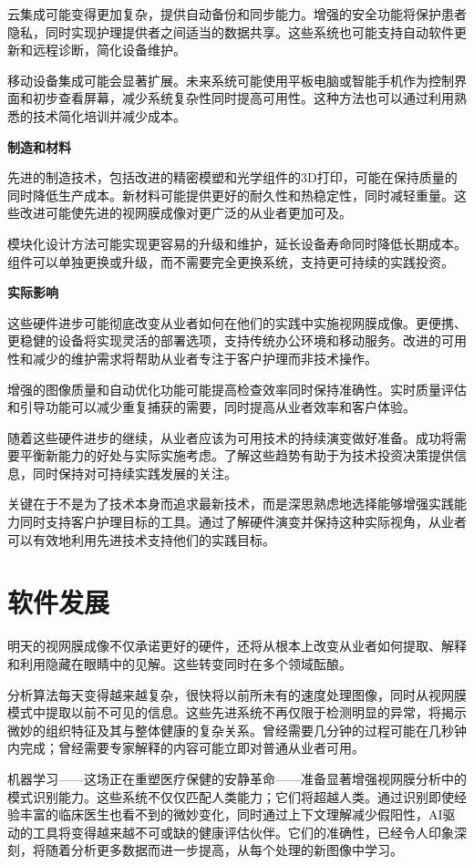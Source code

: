 \documentclass[
  Letterpaper,
]{scrbook}
\begin{document}
云集成可能变得更加复杂，提供自动备份和同步能力。增强的安全功能将保护患者隐私，同时实现护理提供者之间适当的数据共享。这些系统也可能支持自动软件更新和远程诊断，简化设备维护。

移动设备集成可能会显著扩展。未来系统可能使用平板电脑或智能手机作为控制界面和初步查看屏幕，减少系统复杂性同时提高可用性。这种方法也可以通过利用熟悉的技术简化培训并减少成本。

\textbf{制造和材料}

先进的制造技术，包括改进的精密模塑和光学组件的3D打印，可能在保持质量的同时降低生产成本。新材料可能提供更好的耐久性和热稳定性，同时减轻重量。这些改进可能使先进的视网膜成像对更广泛的从业者更加可及。

模块化设计方法可能实现更容易的升级和维护，延长设备寿命同时降低长期成本。组件可以单独更换或升级，而不需要完全更换系统，支持更可持续的实践投资。

\textbf{实际影响}

这些硬件进步可能彻底改变从业者如何在他们的实践中实施视网膜成像。更便携、更稳健的设备将实现灵活的部署选项，支持传统办公环境和移动服务。改进的可用性和减少的维护需求将帮助从业者专注于客户护理而非技术操作。

增强的图像质量和自动优化功能可能提高检查效率同时保持准确性。实时质量评估和引导功能可以减少重复捕获的需要，同时提高从业者效率和客户体验。

随着这些硬件进步的继续，从业者应该为可用技术的持续演变做好准备。成功将需要平衡新能力的好处与实际实施考虑。了解这些趋势有助于为技术投资决策提供信息，同时保持对可持续实践发展的关注。

关键在于不是为了技术本身而追求最新技术，而是深思熟虑地选择能够增强实践能力同时支持客户护理目标的工具。通过了解硬件演变并保持这种实际视角，从业者可以有效地利用先进技术支持他们的实践目标。

\section{软件发展}\label{ux8f6fux4ef6ux53d1ux5c55}

明天的视网膜成像不仅承诺更好的硬件，还将从根本上改变从业者如何提取、解释和利用隐藏在眼睛中的见解。这些转变同时在多个领域酝酿。

分析算法每天变得越来越复杂，很快将以前所未有的速度处理图像，同时从视网膜模式中提取以前不可见的信息。这些先进系统不再仅限于检测明显的异常，将揭示微妙的组织特征及其与整体健康的复杂关系。曾经需要几分钟的过程可能在几秒钟内完成；曾经需要专家解释的内容可能立即对普通从业者可用。

机器学习------这场正在重塑医疗保健的安静革命------准备显著增强视网膜分析中的模式识别能力。这些系统不仅仅匹配人类能力；它们将超越人类。通过识别即使经验丰富的临床医生也看不到的微妙变化，同时通过上下文理解减少假阳性，AI驱动的工具将变得越来越不可或缺的健康评估伙伴。它们的准确性，已经令人印象深刻，将随着分析更多数据而进一步提高，从每个处理的新图像中学习。
\end{document}

